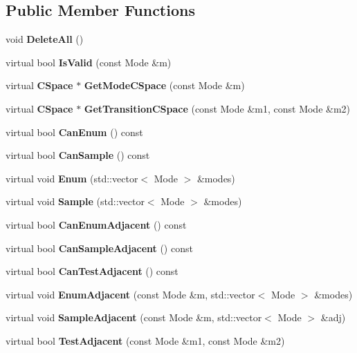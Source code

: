 \subsection*{Public Member Functions}
\begin{DoxyCompactItemize}
\item 
void {\bfseries Delete\+All} ()\label{classExplicitMMCSpace_abbb66e5eabcc9315fa440aebfdb37279}

\item 
virtual bool {\bfseries Is\+Valid} (const Mode \&m)\label{classExplicitMMCSpace_ab86403ad9a528c03d4bef47b96c27af4}

\item 
virtual {\bf C\+Space} $\ast$ {\bfseries Get\+Mode\+C\+Space} (const Mode \&m)\label{classExplicitMMCSpace_a080b76c3e9b6fbbaadf06788e8986dfc}

\item 
virtual {\bf C\+Space} $\ast$ {\bfseries Get\+Transition\+C\+Space} (const Mode \&m1, const Mode \&m2)\label{classExplicitMMCSpace_ab0e5de2a202558fa37166efe63f0081c}

\item 
virtual bool {\bfseries Can\+Enum} () const \label{classExplicitMMCSpace_aa8bc960ae3ce6b41140c07a68f3aed47}

\item 
virtual bool {\bfseries Can\+Sample} () const \label{classExplicitMMCSpace_a6c345ef55469d08c2123ef10d5a9bff4}

\item 
virtual void {\bfseries Enum} (std\+::vector$<$ Mode $>$ \&modes)\label{classExplicitMMCSpace_a9ce70380cf3958b024c0135626e96583}

\item 
virtual void {\bfseries Sample} (std\+::vector$<$ Mode $>$ \&modes)\label{classExplicitMMCSpace_a4431fd733f9704d0e0fb11818b3a0e79}

\item 
virtual bool {\bfseries Can\+Enum\+Adjacent} () const \label{classExplicitMMCSpace_a0e8188bbd57b2f51d4e56a3824fff1d5}

\item 
virtual bool {\bfseries Can\+Sample\+Adjacent} () const \label{classExplicitMMCSpace_ade60ed7e2950f5634c2fb8107984326c}

\item 
virtual bool {\bfseries Can\+Test\+Adjacent} () const \label{classExplicitMMCSpace_a1862c1696fe18a21db710b30aa5d3961}

\item 
virtual void {\bfseries Enum\+Adjacent} (const Mode \&m, std\+::vector$<$ Mode $>$ \&modes)\label{classExplicitMMCSpace_a3c2e277e7ab288bf64e5400b6184c856}

\item 
virtual void {\bfseries Sample\+Adjacent} (const Mode \&m, std\+::vector$<$ Mode $>$ \&adj)\label{classExplicitMMCSpace_a61ea125d818f08914c9e17d5eb7bf605}

\item 
virtual bool {\bfseries Test\+Adjacent} (const Mode \&m1, const Mode \&m2)\label{classExplicitMMCSpace_a9d4cb4887a49a65dacdf516d38790dd8}

\end{DoxyCompactItemize}
